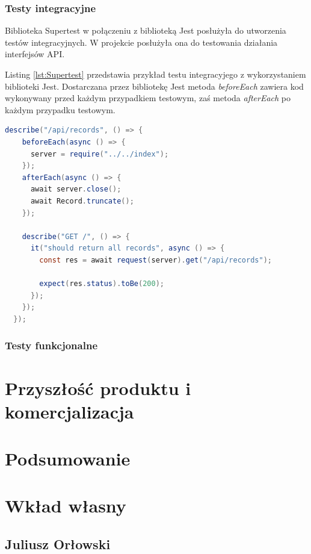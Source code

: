 \documentclass{sprz}
\begin{document}
\subsection{Testy integracyjne}

Biblioteka Supertest w połączeniu z biblioteką Jest posłużyła do utworzenia testów integracyjnych. W projekcie posłużyła ona do testowania działania interfejsów API.

Listing \ref{lst:Supertest} przedstawia przykład testu integracyjego z wykorzystaniem biblioteki Jest. Dostarczana przez bibliotekę Jest metoda \textit{beforeEach} zawiera kod wykonywany przed każdym przypadkiem testowym, zaś metoda \textit{afterEach} po każdym przypadku testowym.

\begin{lstlisting}[language=Java,caption={Test integracyjny z wykorzystaniem Supertest i Jest}, label={lst:Supertest}]
  describe("/api/records", () => {
    beforeEach(async () => {
      server = require("../../index");
    });
    afterEach(async () => {
      await server.close();
      await Record.truncate();
    });
  
    describe("GET /", () => {
      it("should return all records", async () => {
        const res = await request(server).get("/api/records");
  
        expect(res.status).toBe(200);
      });
    });
  });
\end{lstlisting}

\subsection{Testy funkcjonalne}

\chapter{Przyszłość produktu i komercjalizacja}

\chapter{Podsumowanie}

\chapter{Wkład własny}

\section{Juliusz Orłowski}
\end{document}
